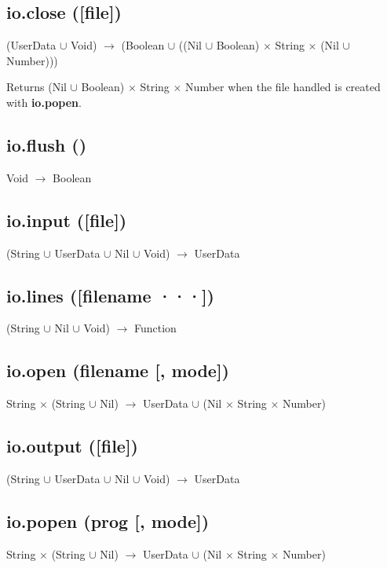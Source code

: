 \documentclass[12pt]{article}
\begin{document}
\subsection{io.close ([file])}

(UserData $\cup$ Void) $\rightarrow$
(Boolean $\cup$ ((Nil $\cup$ Boolean) $\times$ String $\times$ (Nil $\cup$ Number)))

Returns (Nil $\cup$ Boolean) $\times$ String $\times$ Number when
the file handled is created with \textbf{io.popen}.

\subsection{io.flush ()}

Void $\rightarrow$ Boolean

\subsection{io.input ([file])}

(String $\cup$ UserData $\cup$ Nil $\cup$ Void) $\rightarrow$
UserData

\subsection{io.lines ([filename ···])}

(String $\cup$ Nil $\cup$ Void) $\rightarrow$ Function

\subsection{io.open (filename [, mode])}

String $\times$ (String $\cup$ Nil) $\rightarrow$
UserData $\cup$ (Nil $\times$ String $\times$ Number)

\subsection{io.output ([file])}

(String $\cup$ UserData $\cup$ Nil $\cup$ Void) $\rightarrow$
UserData

\subsection{io.popen (prog [, mode])}

String $\times$ (String $\cup$ Nil) $\rightarrow$
UserData $\cup$ (Nil $\times$ String $\times$ Number)
\end{document}
